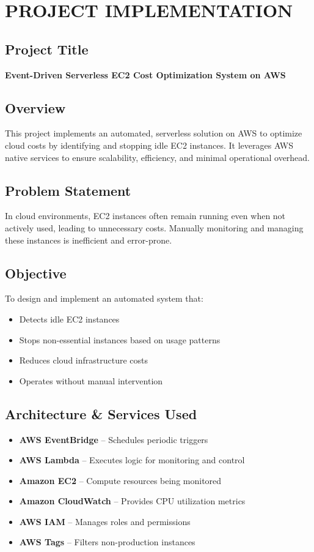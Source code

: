 \documentclass[12pt, a4paper, oneside]{report}
\begin{document}
\chapter{PROJECT IMPLEMENTATION}

\section{Project Title}
\textbf{Event-Driven Serverless EC2 Cost Optimization System on AWS}

\section{Overview}
This project implements an automated, serverless solution on AWS to optimize cloud costs by identifying and stopping idle EC2 instances. It leverages AWS native services to ensure scalability, efficiency, and minimal operational overhead.

\section{Problem Statement}
In cloud environments, EC2 instances often remain running even when not actively used, leading to unnecessary costs. Manually monitoring and managing these instances is inefficient and error-prone.

\section{Objective}
To design and implement an automated system that:
\begin{itemize}[leftmargin=1.5cm]
    \item Detects idle EC2 instances
    \item Stops non-essential instances based on usage patterns
    \item Reduces cloud infrastructure costs
    \item Operates without manual intervention
\end{itemize}

\section{Architecture \& Services Used}
\begin{itemize}[leftmargin=1.5cm]
    \item \textbf{AWS EventBridge} -- Schedules periodic triggers
    \item \textbf{AWS Lambda} -- Executes logic for monitoring and control
    \item \textbf{Amazon EC2} -- Compute resources being monitored
    \item \textbf{Amazon CloudWatch} -- Provides CPU utilization metrics
    \item \textbf{AWS IAM} -- Manages roles and permissions
    \item \textbf{AWS Tags} -- Filters non-production instances
\end{itemize}
\end{document}
